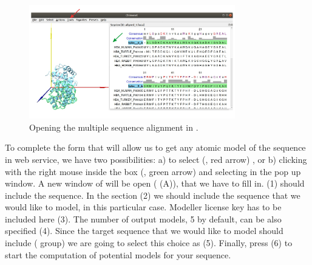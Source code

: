 \begin{itemize}
 \begin{figure}[H]
  \centering 
  \captionsetup{width=.7\linewidth} 
  \includegraphics[width=0.80\textwidth]{Images/Fig14}
  \caption{Opening the multiple sequence alignment in \chimera.}
  \label{fig:chimera_alignment}
  \end{figure}
\end{itemize}

To complete the form that will allow us to get any atomic model of the  sequence in \modeller web service, we have two possibilities: a) to select  (, red arrow) , or b) clicking with the right mouse inside the  box (, green arrow) and selecting  in the pop up window. A new window of  will be open ( (A)), that we have to fill in.  (1) should include the  sequence. In the  section (2) we should include the  sequence that we would like to model,  in this particular case. Modeller license key has to be included here (3). The number of output models, 5 by default, can be also specified (4). Since the target sequence that we would like to model should include  ( group) we are going to select this choice as  (5). Finally, press  (6) to start the computation of potential models for your  sequence.\\

